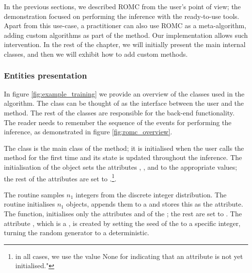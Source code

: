 In the previous sections, we described ROMC from the user's
point of view; the demonstration focused on performing the inference
with the ready-to-use tools. Apart from this use-case, a practitioner
can also use ROMC as a meta-algorithm, adding custom algorithms as
part of the method. Our implementation allows such intervention. In
the rest of the chapter, we will initially present the main internal
classes, and then we will exhibit how to add custom methods.

\subsubsection{Entities presentation}

In figure \ref{fig:example_training} we provide an overview of the
classes used in the algorithm. The class  can be
thought of as the interface between the user and the method. The rest of
the classes are responsible for the back-end functionality. The reader needs to remember the sequence of the events for
performing the inference, as demonstrated in figure
\ref{fig:romc_overview}.

The class  is the main class of the method; it is
initialised when the user calls the method for the first time and its
state is updated throughout the inference. The initialisation of the
 object sets the attributes ,
,  and  to
the appropriate values; the rest of the attributes are set to
.\footnote{in all cases, we use the value None for
  indicating that an attribute is not yet initialised."}.

The  routine samples $n_1$ integers from
the discrete integer distribution. The 
routine initialises $n_1$  objects,
appends them to a  and stores this  as the
 attribute. The
 function, initialises only the
attributes  and  of the
; the rest are set to . The
attribute , which is a , is
created by setting the seed of the  to a
specific integer, turning the random generator to a deterministic.

